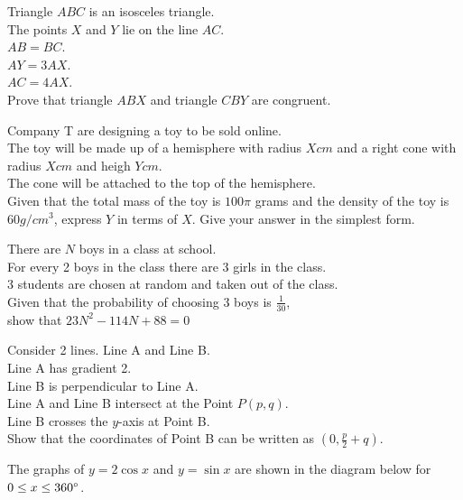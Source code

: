 \documentclass{exam}
\newenvironment{nscenter}
 {\parskip=0pt\par\nopagebreak\centering}
 {\par\noindent\ignorespacesafterend}
\begin{document}
\begin{questions}
    \question Triangle $ABC$ is an isosceles triangle.\\
    The points $X$ and $Y$ lie on the line $AC$.\\
    $AB=BC$.\\
    $AY=3AX$.\\
    $AC=4AX$.\\
    Prove that triangle $ABX$ and triangle $CBY$ are congruent.
    \newpage

    \question Company T are designing a toy to be sold online.\\
    The toy will be made up of a hemisphere with radius $Xcm$ and a right cone with radius $Xcm$ and heigh $Ycm$.\\
    The cone will be attached to the top of the hemisphere.\\

    Given that the total mass of the toy is $100\pi$ grams and the density of the toy is $60g/cm^3$, express $Y$ in terms of $X$. Give your answer in the simplest form.
    \newpage

    \question There are $N$ boys in a class at school.\\
    For every 2 boys in the class there are 3 girls in the class.\\
    3 students are chosen at random and taken out of the class.\\

    Given that the probability of choosing 3 boys is $\frac{1}{30}$, \\show that $23N^2-114N+88=0$
    \newpage

    \question Consider 2 lines. Line A and Line B.\\
    Line A has gradient 2.\\
    Line B is perpendicular to Line A.\\
    Line A and Line B intersect at the Point $P(p,q)$.\\
    Line B crosses the $y$-axis at Point B.\\

    Show that the coordinates of Point B can be written as $(0,\frac{p}{2}+q)$.
    \newpage

    \question The graphs of $y=2\cos{x}$ and $y=\sin{x}$ are shown in the diagram below for $0\leq x\leq 360\degree$.\\
    \begin{nscenter}
\end{nscenter}
\end{questions}
\end{document}
